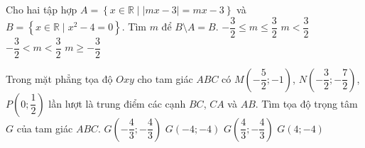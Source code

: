 \begin{ex}%
	Cho hai tập hợp $A=\left\{x\in\mathbb{R}\mid |mx-3|=mx-3\right\}$ và $B=\left\{x\in\mathbb{R}\mid x^2-4=0\right\}$. Tìm $m$ để $B\setminus A=B$.
	\choice
	{$-\dfrac{3}{2}\le m\le \dfrac{3}{2}$}
	{$m<\dfrac{3}{2}$}
	{\True $-\dfrac{3}{2}<m<\dfrac{3}{2}$}
	{$m\ge -\dfrac{3}{2}$}
\end{ex}

\begin{ex}%
	Trong mặt phẳng tọa độ $Oxy$ cho tam giác $ABC$ có $M\left(-\dfrac{5}{2};-1\right)$, $N\left(-\dfrac{3}{2};-\dfrac{7}{2}\right)$, $P\left(0;\dfrac{1}{2}\right)$ lần lượt là trung điểm các cạnh $BC$, $CA$ và $AB$. Tìm tọa độ trọng tâm $G$ của tam giác $ABC$.
	\choice
	{\True $G\left(-\dfrac{4}{3};-\dfrac{4}{3}\right)$}
	{$G(-4;-4)$}
	{$G\left(\dfrac{4}{3};-\dfrac{4}{3}\right)$}
	{$G(4;-4)$}
\end{ex}

